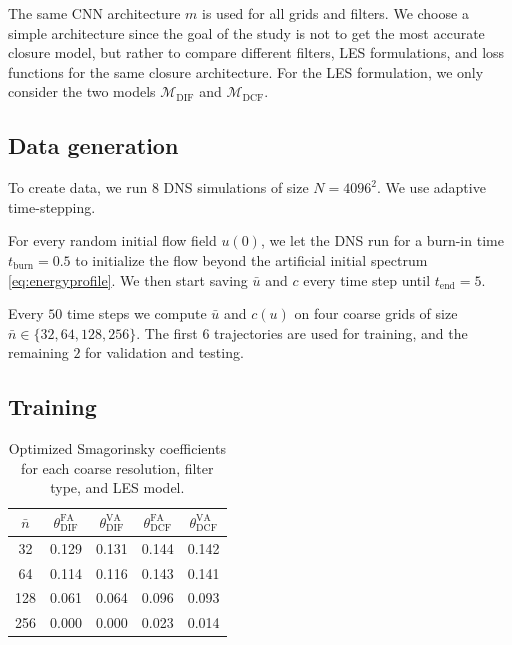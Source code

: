 \documentclass[preprint]{elsarticle}
\newcommand{\p}{\phantom{0}}
\newcommand{\revone}[1]{#1}
\newcommand{\revboth}[1]{#1}
\begin{document}
The same CNN architecture $m$ is used for all grids and filters. We choose a
simple architecture since the goal of the study is not to get the most accurate
closure model, but rather to compare different filters, LES formulations, and
loss functions for the same closure architecture. For the LES formulation, we
only consider the two models $\mathcal{M}_{\text{DIF}}$ and $\mathcal{M}_{\text{DCF}}$.

\subsection{Data generation} \label{sec:datasets}

\revboth{
    
    To create data, we run $8$ DNS simulations of size $N = 4096^2$.
    We use adaptive time-stepping.
}
For every random initial flow field $u(0)$, we let the DNS
run for a burn-in time \revboth{ $t_\text{burn} = 0.5$}
to initialize the flow beyond the artificial initial spectrum
\eqref{eq:energyprofile}.
We then start saving $\bar{u}$ and $c$ every time step until $t_\text{end}
\revboth{= 5}$.
\revboth{
    Every $50$ time steps we compute $\bar{u}$ and $c(u)$ on four coarse
    grids of size $\bar{n} \in \{32, 64, 128, 256\}$. The first $6$ trajectories
    are used for training, and the remaining $2$ for validation and testing.
}

\subsection{Training} \label{sec:training}

\begin{table}
    \centering
    \begin{tabular}{c c c c c}
    \toprule
    $\bar{n}$
         & $\theta^\text{FA}_{\text{DIF}}$
                 & $\theta^\text{VA}_{\text{DIF}}$
                         & $\theta^\text{FA}_{\text{DCF}}$
                                 & $\theta^\text{VA}_{\text{DCF}}$ \\
    \midrule
    \p32 & 0.129 & 0.131 & 0.144 & 0.142 \\
    \p64 & 0.114 & 0.116 & 0.143 & 0.141 \\
     128 & 0.061 & 0.064 & 0.096 & 0.093 \\
     256 & 0.000 & 0.000 & 0.023 & 0.014 \\
    \bottomrule
\end{tabular}

    \caption{\revone{Optimized Smagorinsky coefficients for each coarse resolution, filter type, and LES model.}}
    \label{tab:smagcoeffs}
\end{table}
\end{document}
